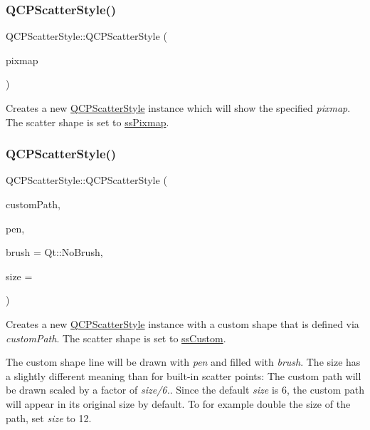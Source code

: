 \subsubsection{\texorpdfstring{Q\+C\+P\+Scatter\+Style()}{QCPScatterStyle()}\hspace{0.1cm}{\footnotesize\ttfamily [6/7]}}
{\footnotesize\ttfamily Q\+C\+P\+Scatter\+Style\+::\+Q\+C\+P\+Scatter\+Style (\begin{DoxyParamCaption}\item[{const Q\+Pixmap \&}]{pixmap }\end{DoxyParamCaption})}

Creates a new \hyperlink{classQCPScatterStyle}{Q\+C\+P\+Scatter\+Style} instance which will show the specified {\itshape pixmap}. The scatter shape is set to \hyperlink{classQCPScatterStyle_adb31525af6b680e6f1b7472e43859349a8718b849ca7c307b07b8e091efb0c31e}{ss\+Pixmap}. \mbox{\label{classQCPScatterStyle_a879c30647683b3cfbde2afecea815e6f}} 
\subsubsection{\texorpdfstring{Q\+C\+P\+Scatter\+Style()}{QCPScatterStyle()}\hspace{0.1cm}{\footnotesize\ttfamily [7/7]}}
{\footnotesize\ttfamily Q\+C\+P\+Scatter\+Style\+::\+Q\+C\+P\+Scatter\+Style (\begin{DoxyParamCaption}\item[{const Q\+Painter\+Path \&}]{custom\+Path,  }\item[{const Q\+Pen \&}]{pen,  }\item[{const Q\+Brush \&}]{brush = {\ttfamily Qt\+:\+:NoBrush},  }\item[{double}]{size = {} }\end{DoxyParamCaption})}

Creates a new \hyperlink{classQCPScatterStyle}{Q\+C\+P\+Scatter\+Style} instance with a custom shape that is defined via {\itshape custom\+Path}. The scatter shape is set to \hyperlink{classQCPScatterStyle_adb31525af6b680e6f1b7472e43859349a15d9bcfd9de94edda949006529f9219d}{ss\+Custom}.

The custom shape line will be drawn with {\itshape pen} and filled with {\itshape brush}. The size has a slightly different meaning than for built-\/in scatter points\+: The custom path will be drawn scaled by a factor of {\itshape size/6.}. Since the default {\itshape size} is 6, the custom path will appear in its original size by default. To for example double the size of the path, set {\itshape size} to 12. 

